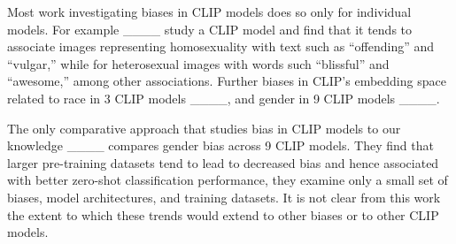 Most work investigating biases in CLIP models does so only for individual models. For example ____ study a  CLIP model and find that it tends to associate images representing homosexuality with text such as ``offending'' and ``vulgar,'' while for heterosexual images with words such ``blissful'' and ``awesome,'' among other associations. Further biases in CLIP's embedding space related to race in 3 CLIP models ____, and gender in 9 CLIP models ____.  

The only comparative approach that studies bias in CLIP models to our knowledge ____ compares gender bias across 9 CLIP models. They find that larger pre-training datasets tend to lead to decreased bias and hence associated with better zero-shot classification performance, they examine only a small set of biases, model architectures, and training datasets. It is not clear from this work the extent to which these trends would extend to other biases or to other CLIP models.